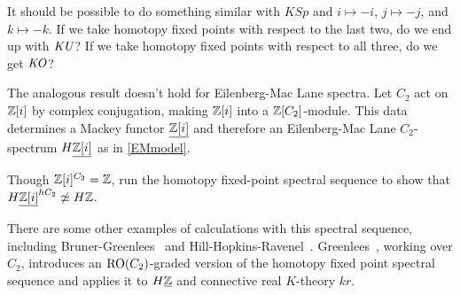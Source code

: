 \begin{ques}
It should be possible to do something similar with $\mathit{KSp}$ and $i\mapsto -i$, $j\mapsto -j$, and $k\mapsto
-k$. If we take homotopy fixed points with respect to the last two, do we end up with $\mathit{KU}$? If we take homotopy
fixed points with respect to all three, do we get $\mathit{KO}$?
\end{ques}
\begin{ex}
The analogous result doesn't hold for Eilenberg-Mac Lane spectra. Let $C_2$ act on $\mathbb Z[i]$ by complex conjugation,
making $\mathbb Z[i]$ into a $\mathbb Z[C_2]$-module. This data determines a Mackey functor $\underline{\mathbb Z[i]}$ and therefore an
Eilenberg-Mac Lane $C_2$-spectrum $H\underline{\mathbb Z[i]}$ as in \cref{EMmodel}.

Though $\mathbb Z[i]^{C_2} = \mathbb Z$, run the homotopy fixed-point spectral sequence to show that
$H\underline{\mathbb Z[i]}^{hC_2}\not\simeq H\mathbb Z$.
\end{ex}
There are some other examples of calculations with this spectral sequence, including Bruner-Greenlees~\cite{BG10}
and Hill-Hopkins-Ravenel~\cite{HHREO2, HHR}. Greenlees~\cite{GreenCalc}, working over $C_2$, introduces an
$\mathrm{RO}(C_2)$-graded version of the homotopy fixed point spectral sequence and applies it to $H\underline{\mathbb Z}$ and
connective real $K$-theory $\mathit{kr}$.

